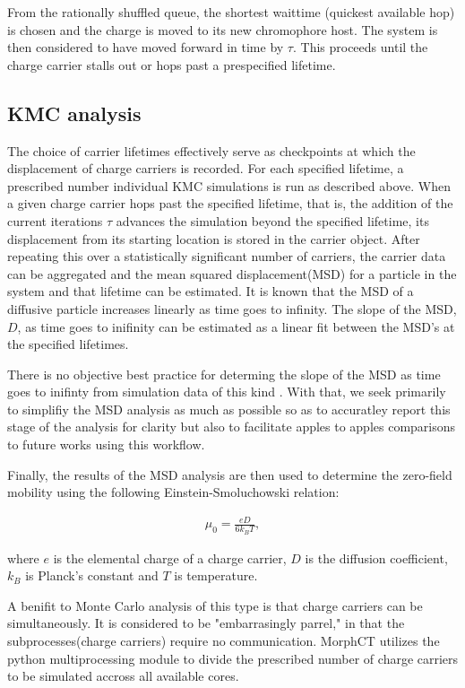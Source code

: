 From the rationally shuffled queue, the shortest waittime (quickest available hop) is chosen and the charge is moved to
its new chromophore host. The system is then considered to have moved forward in time by $\tau$. This proceeds
until the charge carrier stalls out or hops past a prespecified lifetime. 



\subsection{KMC analysis}

The choice of carrier lifetimes effectively serve as checkpoints at which the displacement of charge carriers is recorded. For
each specified lifetime, a prescribed number individual KMC simulations is run as described above. When a
given charge carrier hops past the specified lifetime, that is, the addition of the current iterations $\tau$ advances
the simulation beyond the specified lifetime,  its displacement from its starting location is stored in the carrier object. After repeating this over a
statistically significant number of carriers, the carrier data can be aggregated and the mean squared
displacement(MSD) for a particle in the system and that lifetime can be estimated.
It is known that the MSD of a diffusive particle increases linearly as time goes to infinity. 
The slope of the MSD, $D$,  as time
goes to inifinity can be estimated as a linear fit between the MSD's at the specified lifetimes.

There is no objective best practice for determing the slope of the MSD as
time goes to inifinty from simulation data of this kind \cite{Maginn2018}. With that, we seek primarily to simplifiy the MSD analysis as much as
possible so as to accuratley report this stage of the analysis for clarity but also to facilitate apples to
apples comparisons to future works using this workflow. 

Finally, the results of the MSD analysis are then used to determine the zero-field mobility using the following Einstein-Smoluchowski relation:

\begin{align}
    \mu_{0} = \frac{eD}{6k_{B}T},
\end{align}

where $e$ is the elemental charge of a charge carrier, $D$ is the diffusion coefficient, $k_{B}$ is Planck's
constant and $T$ is temperature.  

A benifit to Monte Carlo analysis of this type is that charge carriers can be simultaneously. It is considered
to be "embarrasingly parrel," in that the subprocesses(charge carriers) require no communication.
MorphCT utilizes the python multiprocessing module to divide the prescribed number of charge carriers to be
simulated accross all available cores.  

